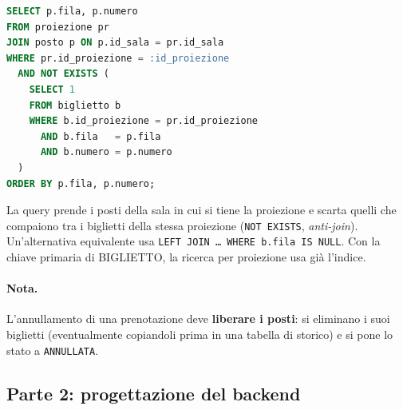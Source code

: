 \begin{lstlisting}[language=SQL, caption={Posti ancora disponibili per una proiezione}]
SELECT p.fila, p.numero
FROM proiezione pr
JOIN posto p ON p.id_sala = pr.id_sala
WHERE pr.id_proiezione = :id_proiezione
  AND NOT EXISTS (
    SELECT 1
    FROM biglietto b
    WHERE b.id_proiezione = pr.id_proiezione
      AND b.fila   = p.fila
      AND b.numero = p.numero
  )
ORDER BY p.fila, p.numero;
\end{lstlisting}
La query prende i posti della sala in cui si tiene la proiezione e scarta quelli che compaiono tra i biglietti della stessa proiezione (\texttt{NOT EXISTS}, \emph{anti-join}). Un'alternativa equivalente usa \texttt{LEFT JOIN \ldots{} WHERE b.fila IS NULL}. Con la chiave primaria di BIGLIETTO, la ricerca per proiezione usa già l'indice.

\paragraph{Nota.} L'annullamento di una prenotazione deve \textbf{liberare i posti}: si eliminano i suoi biglietti (eventualmente copiandoli prima in una tabella di storico) e si pone lo stato a \texttt{ANNULLATA}.

\subsection{Parte 2: progettazione del backend}

